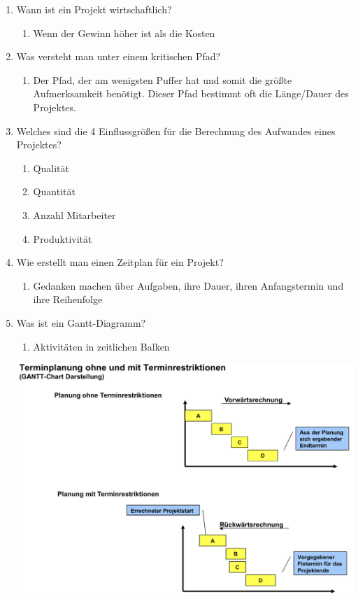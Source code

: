 \documentclass[12pt,a4paper]{article}
\begin{document}
\begin{enumerate}
\begin{enumerate}
\begin{enumerate}
		\end{enumerate}
	\end{enumerate}
	\item Wann ist ein Projekt wirtschaftlich?
	\begin{enumerate}
		\item Wenn der Gewinn höher ist als die Kosten
	\end{enumerate}
	\item Was versteht man unter einem kritischen Pfad?
	\begin{enumerate}
		\item Der Pfad, der am wenigsten Puffer hat und somit die größte Aufmerksamkeit benötigt. Dieser Pfad bestimmt oft die Länge/Dauer des Projektes.
	\end{enumerate}
	\item Welches sind die 4 Einflussgrößen für die Berechnung des Aufwandes eines Projektes?
	\begin{enumerate}
		\item Qualität
		\item Quantität
		\item Anzahl Mitarbeiter
		\item Produktivität
	\end{enumerate}
	\item Wie erstellt man einen Zeitplan für ein Projekt?
	\begin{enumerate}
		\item Gedanken machen über Aufgaben, ihre Dauer, ihren Anfangstermin und ihre Reihenfolge
	\end{enumerate}
	\newpage
	\item Was ist ein Gantt-Diagramm?
	\begin{enumerate}
		\item Aktivitäten in zeitlichen Balken
	\end{enumerate}
	\begin{center}
		\includegraphics[scale=.175]{Bilder/Gantt.JPG}	

\end{center}
\end{enumerate}
\end{document}

